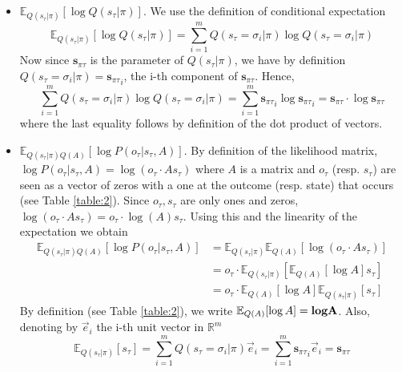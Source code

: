 \documentclass[review,12pt,authoryear]{elsarticle}
\newcommand{\R}{\mathbb R}
\newcommand{\E}{\mathbb E}
\begin{document}
\begin{itemize}
    \item $\E_{Q(s_\tau |\pi)}[\log Q(s_\tau |\pi)]$. We use the definition of conditional expectation
    \begin{equation*}
        \E_{Q(s_\tau |\pi)}[\log Q(s_\tau |\pi)]= \sum_{i=1}^m Q(s_\tau =\sigma_i |\pi) \log Q(s_\tau =\sigma_i |\pi)
    \end{equation*}
    Now since $\mathbf s_{\pi \tau}$ is the parameter of $Q(s_\tau |\pi)$, we have by definition $Q(s_\tau = \sigma_i|\pi)={\mathbf s_{\pi \tau}}_i$, the i-th component of $\mathbf s_{\pi \tau}$. Hence,
    \begin{equation*}
        \sum_{i=1}^m Q(s_\tau =\sigma_i |\pi) \log Q(s_\tau =\sigma_i |\pi) = \sum_{i=1}^m{\mathbf s_{\pi \tau}}_i \log {\mathbf s_{\pi \tau}}_i = \mathbf s_{\pi \tau} \cdot \log \mathbf s_{\pi \tau}
    \end{equation*}
    where the last equality follows by definition of the dot product of vectors.
    \item $\E_{Q(s_\tau |\pi)Q(A)}[\log P(o_{\tau}|s_{\tau},A)]$. By definition of the likelihood matrix, $\log P(o_{\tau}|s_{\tau},A)= \log(o_\tau \cdot A s_\tau)$ where $A$ is a matrix and $o_\tau$ (resp. $s_\tau$) are seen as a vector of zeros with a one at the outcome (resp. state) that occurs (see Table \ref{table:2}). Since $o_\tau, s_\tau$ are only ones and zeros, $\log (o_\tau \cdot A s_\tau)=o_\tau \cdot \log(A) s_\tau$. Using this and the linearity of the expectation we obtain
    \begin{equation*}
    \begin{split}
        \E_{Q(s_\tau |\pi)Q(A)}[\log P(o_{\tau}|s_{\tau},A)] &= \E_{Q(s_\tau|\pi)}\E_{Q(A)}[\log (o_\tau \cdot A s_\tau)] \\
        &= o_\tau \cdot \E_{Q(s_\tau|\pi)}\left[\E_{Q(A)}[\log A] s_\tau\right] \\
        &=o_\tau \cdot \E_{Q(A)}[\log A] \E_{Q(s_\tau|\pi)}\left[s_\tau\right]
    \end{split}
    \end{equation*}
    By definition (see Table \ref{table:2}), we write $\E_{Q(A)}[\log A]=\textbf{log} \bold A$. Also, denoting by $\vec e_i$ the i-th unit vector in $\R^m$
    \begin{equation*}
        \E_{Q(s_\tau|\pi)}\left[s_\tau\right] = \sum_{i=1}^m Q(s_\tau= \sigma_i|\pi) \vec e_i =\sum_{i=1}^m {\mathbf s_{\pi \tau}}_i \vec e_i = \mathbf s_{\pi \tau}
    \end{equation*}

\end{itemize}
\end{document}
